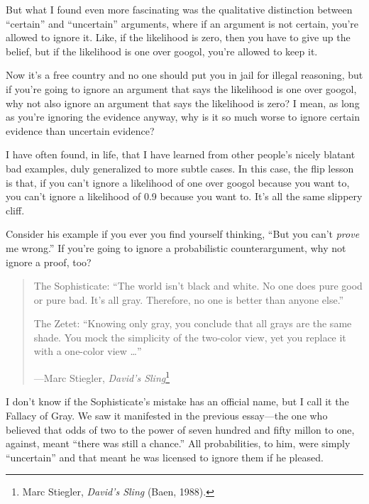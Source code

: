 {
 But what I found even more fascinating was the qualitative
distinction between ``certain'' and
``uncertain'' arguments, where if an
argument is not certain, you're allowed to ignore it.
Like, if the likelihood is zero, then you have to give up the belief,
but if the likelihood is one over googol, you're
allowed to keep it.}

{
 Now it's a free country and no one should put you
in jail for illegal reasoning, but if you're going to
ignore an argument that says the likelihood is one over googol, why not
also ignore an argument that says the likelihood is zero? I mean, as
long as you're ignoring the evidence anyway, why is it
so much worse to ignore certain evidence than uncertain evidence?}

{
 I have often found, in life, that I have learned from other
people's nicely blatant bad examples, duly generalized
to more subtle cases. In this case, the flip lesson is that, if you
can't ignore a likelihood of one over googol because
you want to, you can't ignore a likelihood of 0.9
because you want to. It's all the same slippery cliff.}

{
 Consider his example if you ever you find yourself thinking,
``But you can't \textit{prove} me
wrong.'' If you're going to ignore a
probabilistic counterargument, why not ignore a proof, too?}

\myendsectiontext


\begin{quote}
{
 The Sophisticate: ``The world
isn't black and white. No one does pure good or pure
bad. It's all gray. Therefore, no one is better than
anyone else.''}

{
 The Zetet: ``Knowing only gray, you conclude that
all grays are the same shade. You mock the simplicity of the two-color
view, yet you replace it with a one-color view
\ldots''}

{\raggedleft
 {}---Marc Stiegler, \textit{David's
Sling}\footnote{Marc Stiegler, \textit{David's Sling} (Baen,
1988).}
\par}
\end{quote}


{
 I don't know if the Sophisticate's
mistake has an official name, but I call it the Fallacy of Gray. We saw
it manifested in the previous essay---the one who believed that odds of
two to the power of seven hundred and fifty millon to one, against,
meant ``there was still a chance.''
All probabilities, to him, were simply
``uncertain'' and that meant he was
licensed to ignore them if he pleased.}

